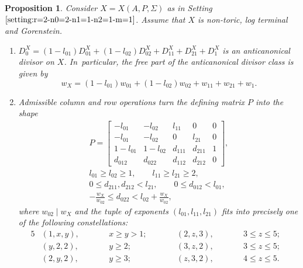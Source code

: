 \documentclass[10pt,a4paper]{amsart}
\newtheorem{prop}[thm]{Proposition}
\theoremstyle{definition}
\numberwithin{equation}{section}
\begin{document}
\begin{prop}\label{prop:sample-1}\samepage
Consider $X = X(A,P,\Sigma)$ as in
Setting~$\ref{setting:r=2-n0=2-n1=1-n2=1-m=1}$.
Assume that $X$ is non-toric, log terminal
and Gorenstein.
\begin{enumerate}\itemsep=0pt
\item[$(i)$]
$D_0^X = (1-l_{01})D_{01}^X + (1-l_{02})D_{02}^X + D_{11}^X + D_{21}^X + D_1^X$
is an anticanonical divisor on $X$.
In~particular, the free part of the anticanonical divisor class
is given by
\[
w_X = (1-l_{01})w_{01} + (1-l_{02})w_{02} + w_{11} + w_{21} + w_{1}.
\]
\item[$(ii)$]
Admissible column and row operations turn
the defining matrix $P$ into the shape
\begin{gather*}
P
 =
\begin{bmatrix}
-l_{01} & -l_{02} & l_{11} & 0 & 0
\\
-l_{01} & -l_{02} & 0 & l_{21} & 0
\\
1-l_{01} & 1-l_{02} & d_{111} & d_{211} & 1
\\
d_{012} & d_{022} & d_{112} & d_{212} & 0
\end{bmatrix},
\\[1ex]
l_{01} \ge l_{02} \ge 1, \qquad
 l_{11} \ge l_{21} \ge 2,
\\[1ex]
 0 \le d_{211}, d_{212} < l_{21},\qquad
 0 \le d_{012} < l_{01},
\\[1ex]
 -\frac{w_X}{w_{02}} \le d_{022} < l_{02} + \frac{w_X}{w_{02}},
\end{gather*}
where $w_{02} \mid w_X$ and the tuple of exponents
$(l_{01},l_{11},l_{21})$
fits into precisely one of the following constellations:
\begin{alignat*}{5}
& (1,x,y), \qquad &&x \ge y > 1; \qquad && (2,z,3), \qquad &&3 \le z \le 5;&
\\
&(y,2,2), \qquad &&y \ge 2; \qquad && (3,z,2), \qquad &&3 \le z \le 5;&
\\
&(2,y,2), \qquad &&y \ge 3; \qquad && (z,3,2), \qquad && 4 \le z \le 5.&
\end{alignat*}
\end{enumerate}
\end{prop}
\end{document}
